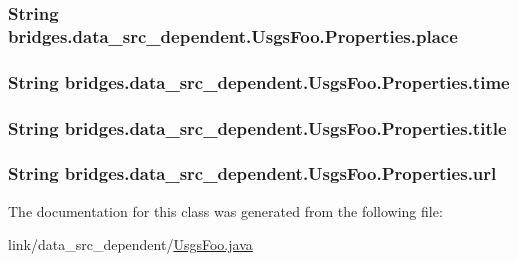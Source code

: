 \subsubsection[{place}]{\setlength{\rightskip}{0pt plus 5cm}String bridges.\+data\+\_\+src\+\_\+dependent.\+Usgs\+Foo.\+Properties.\+place}\label{classbridges_1_1data__src__dependent_1_1_usgs_foo_1_1_properties_a78104fd6df6eec29b1598669127df9ed}
\hypertarget{classbridges_1_1data__src__dependent_1_1_usgs_foo_1_1_properties_a6e42210e723e44d15bcea954ccd6b579}{}
\subsubsection[{time}]{\setlength{\rightskip}{0pt plus 5cm}String bridges.\+data\+\_\+src\+\_\+dependent.\+Usgs\+Foo.\+Properties.\+time}\label{classbridges_1_1data__src__dependent_1_1_usgs_foo_1_1_properties_a6e42210e723e44d15bcea954ccd6b579}
\hypertarget{classbridges_1_1data__src__dependent_1_1_usgs_foo_1_1_properties_a8ffe112286f04d57850831222e1c50d6}{}
\subsubsection[{title}]{\setlength{\rightskip}{0pt plus 5cm}String bridges.\+data\+\_\+src\+\_\+dependent.\+Usgs\+Foo.\+Properties.\+title}\label{classbridges_1_1data__src__dependent_1_1_usgs_foo_1_1_properties_a8ffe112286f04d57850831222e1c50d6}
\hypertarget{classbridges_1_1data__src__dependent_1_1_usgs_foo_1_1_properties_a42e5d1f2c28c6708921861ed95aa5e5f}{}
\subsubsection[{url}]{\setlength{\rightskip}{0pt plus 5cm}String bridges.\+data\+\_\+src\+\_\+dependent.\+Usgs\+Foo.\+Properties.\+url}\label{classbridges_1_1data__src__dependent_1_1_usgs_foo_1_1_properties_a42e5d1f2c28c6708921861ed95aa5e5f}


The documentation for this class was generated from the following file\+:\begin{DoxyCompactItemize}
\item 
link/data\+\_\+src\+\_\+dependent/\hyperlink{_usgs_foo_8java}{Usgs\+Foo.\+java}\end{DoxyCompactItemize}
